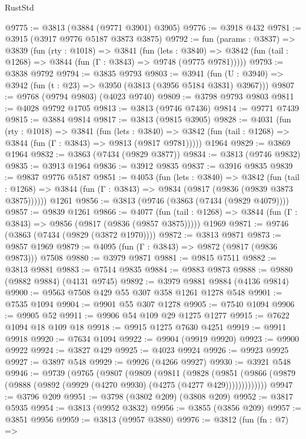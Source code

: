 \begin{lexlean}{RustStd}
\begin{coremodule}
@9775 := @3813 (@3884 (@9771 @3901) @3905)
@9776 := @3918 @432
@9781 := @3915 (@3917 @9776 @5187 @3873 @3875)
@9792 := fun (params : @3837) =>
  @3839
    (fun (rty : @1018) =>
    @3841
      (fun (lets : @3840) =>
      @3842 (fun (tail : @1268) => @3844 (fun (Γ : @3843) => @9748 (@9775 @9781)))))
@9793 := @3838 @9792
@9794 := @3835 @9793
@9803 := @3941 (fun (U : @3940) => @3942 (fun (t : @23) => @3950 (@3813 (@3956 @5184 @3831) @3967)))
@9807 := @9768 (@9794 @9803) (@4023 @9740)
@9809 := @3798 @9793 @9803
@9811 := @4028 @9792 @1705
@9813 := @3813 (@9746 @7436)
@9814 := @9771 @7439
@9815 := @3884 @9814
@9817 := @3813 (@9815 @3905)
@9828 := @4031
    (fun (rty : @1018) =>
    @3841
      (fun (lets : @3840) =>
      @3842 (fun (tail : @1268) => @3844 (fun (Γ : @3843) => @9813 (@9817 @9781)))))
    @1964
@9829 := @3869 @1964
@9832 := @3863 (@7434 (@9829 @3877))
@9834 := @3813 (@9746 @9832)
@9835 := @3913 @1964
@9836 := @3912 @9835
@9837 := @3916 @9835
@9839 := @9837 @9776 @5187
@9851 := @4053
    (fun (lets : @3840) =>
    @3842
      (fun (tail : @1268) => @3844 (fun (Γ : @3843) => @9834 (@9817 (@9836 (@9839 @3873 @3875))))))
    @1261
@9856 := @3813 (@9746 (@3863 (@7434 (@9829 @4079))))
@9857 := @9839 @1261
@9866 := @4077
    (fun (tail : @1268) => @3844 (fun (Γ : @3843) => @9856 (@9817 (@9836 (@9857 @3875)))))
    @1969
@9871 := @9746 (@3863 (@7434 (@9829 (@3872 @1970))))
@9872 := @3813 @9871
@9873 := @9857 @1969
@9879 := @4095 (fun (Γ : @3843) => @9872 (@9817 (@9836 @9873))) @7508
@9880 := @3979 @9871
@9881 := @9815 @7511
@9882 := @3813 @9881
@9883 := @7514 @9835
@9884 := @9883 @9873
@9888 := @9880 (@9882 @9884) (@4131 @9745)
@9892 := @3979 @9881 @9884 (@4136 @9814)
@9900 := @9563 @7508 @429 @55 @307 @358 @1261 @1278 @548
@9901 := @7535 @1094
@9904 := @9901 @55 @307 @1278
@9905 := @7540 @1094
@9906 := @9905 @52
@9911 := @9906 @54 @109 @29 @1275 @1277
@9915 := @7622 @1094 @18 @109 @18
@9918 := @9915 @1275 @7630 @4251
@9919 := @9911 @9918
@9920 := @7634 @1094
@9922 := @9904 (@9919 @9920)
@9923 := @9900 @9922
@9924 := @3827 @429
@9925 := @4023 @9924
@9926 := @9923 @9925
@9927 := @3897 @548
@9929 := @9926 (@4266 @9927)
@9930 := @3921 @548
@9946 := @9739
    (@9765
      (@9807
        (@9809
          (@9811
            (@9828
              (@9851
                (@9866 (@9879 (@9888 (@9892 (@9929 (@4270 @9930) (@4275 (@4277 @429)))))))))))))
@9947 := @3796 @209
@9951 := @3798 (@3802 @209) (@3808 @209)
@9952 := @3817 @5935
@9954 := @3813 (@9952 @3832)
@9956 := @3855 (@3856 @209)
@9957 := @3851 @9956
@9959 := @3813 (@9957 @3880)
@9976 := @3812
    (fun (fn : @7) =>

\end{coremodule}
\end{lexlean}
